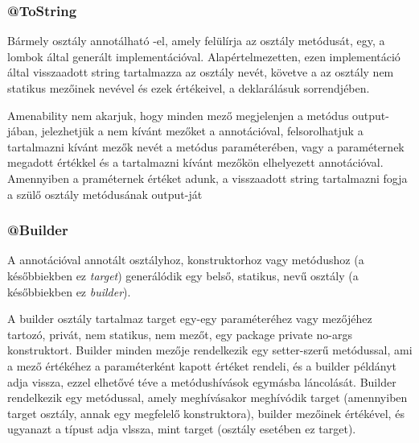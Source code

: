 \subsubsection{@ToString}

Bármely osztály annotálható -el, amely felülírja az osztály  metódusát, egy, a lombok által generált implementációval. Alapértelmezetten, ezen implementáció által visszaadott string tartalmazza az osztály nevét, követve a az osztály nem statikus mezőinek nevével és ezek értékeivel, a deklarálásuk sorrendjében. \par

Amenability nem akarjuk, hogy minden mező megjelenjen a metódus output-jában, jelezhetjük a nem kívánt mezőket a  annotációval, felsorolhatjuk a tartalmazni kívánt mezők nevét a  metódus  paraméterében, vagy a  paraméternek megadott  értékkel és a tartalmazni kívánt mezőkön elhelyezett  annotációval. Amennyiben a  praméternek  értéket adunk, a visszaadott string tartalmazni fogja a szülő osztály  metódusának output-ját \par

\subsubsection{@Builder}

A  annotációval annotált  osztályhoz, konstruktorhoz vagy metódushoz (a későbbiekben ez \emph{target}) generálódik egy belső, statikus,  nevű osztály (a későbbiekben ez \emph{builder}). \par

A builder osztály tartalmaz target egy-egy paraméteréhez vagy mezőjéhez tartozó, privát, nem statikus, nem  mezőt, egy package private no-args konstruktort. Builder minden mezője rendelkezik egy setter-szerű metódussal, ami a mező értékéhez a paraméterként kapott értéket rendeli, és a builder példányt adja vissza, ezzel elhetővé téve a metódushívások egymásba láncolását. Builder rendelkezik egy  metódussal, amely meghívásakor meghívódik target (amennyiben target osztály, annak egy megfelelő konstruktora), builder mezőinek értékével, és ugyanazt a típust adja vlssza, mint target (osztály esetében ez target). \par

